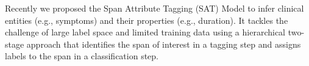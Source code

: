 Recently we proposed the Span Attribute Tagging (SAT) Model to infer clinical entities (e.g., symptoms) and their properties (e.g., duration). It tackles the challenge of large label space and limited training data using a hierarchical two-stage approach that identifies the span of interest in a tagging step and assigns labels to the span in a classification step.